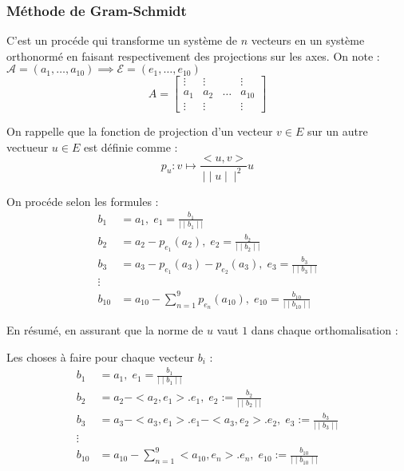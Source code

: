 \documentclass{article}
\begin{document}
\subsubsection{Méthode de Gram-Schmidt}

C'est un procéde qui transforme un système de $n$ vecteurs en un système orthonormé en faisant respectivement des projections sur les axes. On note : $\mathcal{A} = (a_1, \ldots, a_{10}) \implies \mathcal{E} = (e_1, \ldots, e_{10})$
\[
    A = \begin{bmatrix} \vdots & \vdots & & \vdots \\ 
    a_1 & a_2 & \ldots & a_{10} \\
    \vdots & \vdots & & \vdots \end{bmatrix}
\]


On rappelle que la fonction de projection d'un vecteur $v \in E$ sur un autre vectueur  $u \in E$ est définie comme :
\[
p_u : v \mapsto \frac{<u, v>}{ \mid  \mid u  \mid  \mid ^2}  u
\]


On procéde selon les formules :
\begin{align*}
    b_1 &= a_1, \;e_1 = \frac{b_1}{  \mid  \mid b_1  \mid  \mid }   \\
    b_2 &= a_2 - p_{e_1}(a_2),\;  e_2 =  \frac{b_2}{ \mid  \mid b_2 \mid  \mid }  \\
    b_3 &= a_3 - p_{e_1}(a_3) - p_{e_2}(a_3),\; e_3 = \frac{b_3}{ \mid  \mid b_3 \mid  \mid }   \\
    \vdots \\
    b_{10} &= a_{10} - \sum_{n=1}^{9} p_{e_n}(a_{10}), \;e_{10} = \frac{b_{10}}{ \mid  \mid b_{10} \mid  \mid } 
\end{align*}

En résumé, en assurant que la norme de $u$ vaut $1$ dans chaque orthomalisation :
\begin{tcolorbox}[title={Process de l'orthomalisation de Gram-Schmidt}, fonttitle = \bfseries \sffamily]
    Les choses à faire pour chaque vecteur $b_i$ :
\begin{align*}
    b_1 &= a_1, \;e_1 = \frac{b_1}{  \mid  \mid b_1  \mid  \mid }   \\
    b_2 &= a_2 - <a_2, e_1>.e_1,\;  e_2 :=  \frac{b_2}{ \mid  \mid b_2 \mid  \mid }  \\
    b_3 &= a_3 - <a_3, e_1>.e_1 - <a_3, e_2>.e_2,\; e_3 := \frac{b_3}{ \mid  \mid b_3 \mid  \mid }   \\
    \vdots \\
    b_{10} &= a_{10} - \sum_{n=1}^{9} <a_{10}, e_n>.e_n,\;e_{10} := \frac{b_{10}}{ \mid  \mid b_{10} \mid  \mid } 
\end{align*}
\end{tcolorbox}
\end{document}
